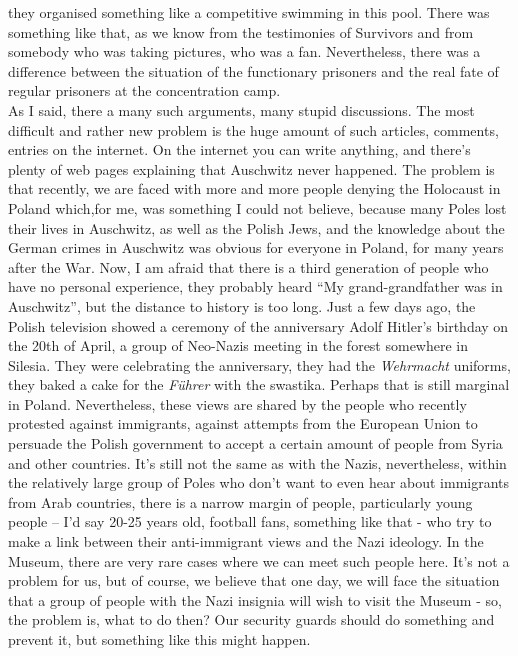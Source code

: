they organised something like a competitive swimming in this pool. There was something like that, as we know from the testimonies of Survivors and from somebody who was taking pictures, who was a fan. Nevertheless, there was a difference between the situation of the functionary prisoners and the real fate of regular prisoners at the concentration camp. \\
As I said, there a many such arguments, many stupid discussions. The most difficult and rather new problem is the huge amount of such articles, comments, entries on the internet. On the internet you can write anything, and there’s plenty of web pages explaining that Auschwitz never happened. The problem is that recently, we are faced with more and more people denying the Holocaust in Poland which,for me, was something I could not believe, because many Poles lost their lives in Auschwitz, as well as the Polish Jews, and the knowledge about the German crimes in Auschwitz was obvious for everyone in Poland, for many years after the War. Now, I am afraid that there is a third generation of people who have no personal experience, they probably heard ``My grand-grandfather was in Auschwitz'', but the distance to history is too long. Just a few days ago, the Polish television showed a ceremony of the anniversary Adolf Hitler's birthday on the 20th of April, a group of Neo-Nazis meeting in the forest somewhere in Silesia. They were celebrating the anniversary, they had the \textit{Wehrmacht} uniforms, they baked a cake for the \textit{Führer} with the swastika. Perhaps that is still marginal in Poland. Nevertheless, these views are shared by the people who recently protested against immigrants, against attempts from the European Union to persuade the Polish government to accept a certain amount of people from Syria and other countries. It's still not the same as with the Nazis, nevertheless, within the relatively large group of Poles who don't want to even hear about immigrants from Arab countries, there is a narrow margin of people, particularly young people – I’d say 20-25 years old, football fans, something like that - who try to make a link between their anti-immigrant views and the Nazi ideology. In the Museum, there are very rare cases where we can meet such people here. It's not a problem for us, but of course, we believe that one day, we will face the situation that a group of people with the Nazi insignia will wish to visit the Museum - so, the problem is, what to do then? Our security guards should do something and prevent it, but something like this might happen.\\
